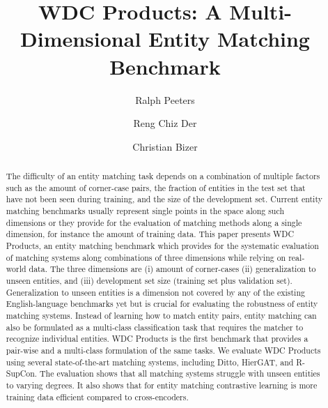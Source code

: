 \documentclass[sigconf,edbt]{acmart-edbt2024}
\begin{document}
\title{WDC Products: A Multi-Dimensional Entity Matching Benchmark}



\author{Ralph Peeters}

\author{Reng Chiz Der}

\author{Christian Bizer}

\renewcommand{\shortauthors}{Peeters et al.}


\begin{abstract}
The difficulty of an entity matching task depends on a combination of multiple factors such as the amount of corner-case pairs, the fraction of entities in the test set that have not been seen during training, and the size of the development set. Current entity matching benchmarks usually represent single points in the space along such dimensions or they provide for the evaluation of matching methods along a single dimension, for instance the amount of training data. This paper presents WDC Products, an entity matching benchmark which provides for the systematic evaluation of matching systems along combinations of three dimensions while relying on real-world data. The three dimensions are (i) amount of corner-cases (ii) generalization to unseen entities, and (iii) development set size (training set plus validation set). Generalization to unseen entities is a dimension not covered by any of the existing English-language benchmarks yet but is crucial for evaluating the robustness of entity matching systems. Instead of learning how to match entity pairs, entity matching can also be formulated as a multi-class classification task that requires the matcher to recognize individual entities. WDC Products is the first benchmark that provides a pair-wise and a multi-class formulation of the same tasks. We evaluate WDC Products using several state-of-the-art matching systems, including Ditto, HierGAT, and R-SupCon. The evaluation shows that all matching systems struggle with unseen entities to varying degrees. It also shows that for entity matching contrastive learning is more training data efficient compared to cross-encoders.
\end{abstract}
\end{document}

